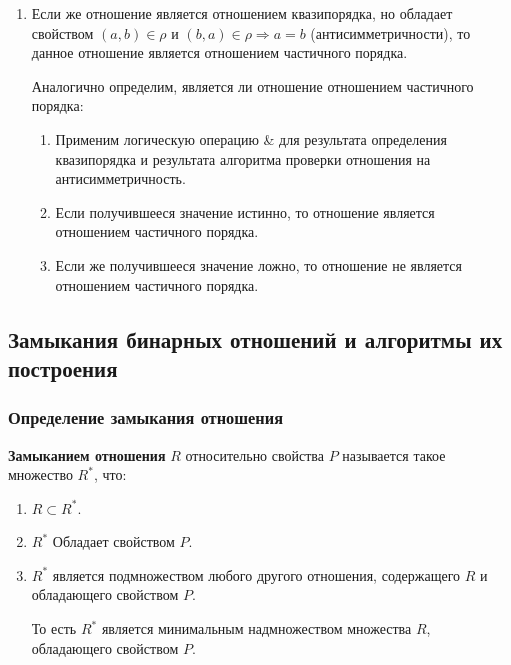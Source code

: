 \documentclass[bachelor, och, labwork]{shiza}
\begin{document}
\begin{enumerate}
    \item Если же отношение является отношением квазипорядка, но обладает
    свойством $(a,b) \in\rho$ и $(b,a) \in\rho\Rightarrow a = b$
    (антисимметричности), то данное отношение является отношением частичного 
    порядка.
   
    Аналогично определим, является ли отношение отношением частичного порядка:
   
    \begin{enumerate}
        \item Применим логическую операцию \& для результата определения
        квазипорядка и результата алгоритма проверки отношения на 
        антисимметричность.
        
        \item Если получившееся значение истинно, то отношение является 
        отношением частичного порядка.
        
        \item Если же получившееся значение ложно, то отношение не является
        отношением частичного порядка.
    
    \end{enumerate}


\end{enumerate}

\subsection{Замыкания бинарных отношений и алгоритмы их построения}

\subsubsection{Определение замыкания отношения}

\textbf{Замыканием отношения} $R$ относительно свойства $P$ называется такое
множество $R^*$, что:

\begin{enumerate}

    \item $R \subset R^*$.

    \item $R^*$ Обладает свойством $P$.

    \item $R^*$ является подмножеством любого другого отношения, содержащего $R$
    и обладающего свойством $P$. 

    То есть $R^*$ является минимальным надмножеством множества $R$, 
    обладающего свойством $P$.

\end{enumerate}
\end{document}
